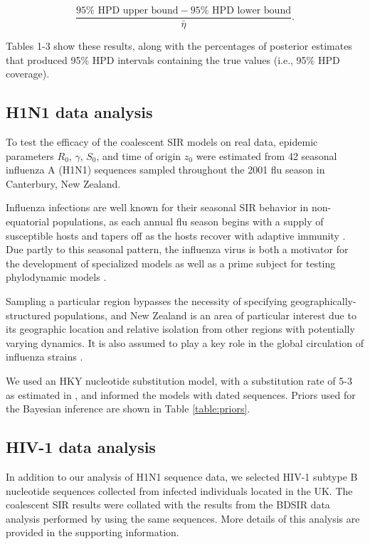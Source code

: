 \documentclass[12pt,titlepage]{article}
\newcommand{\BDSIR}{BDSIR}
\begin{document}
\vspace{3 mm}
\vspace{1 mm}
$$\frac{95\% \text{ HPD upper bound} - 95\% \text{ HPD lower bound}}{\bar{\eta}} . $$

Tables 1-3 show these results, along with the percentages of posterior estimates that produced 95\% HPD intervals containing the true values (i.e., 95\% HPD coverage).


\subsection{H1N1 data analysis}

To test the efficacy of the coalescent SIR models on real data, epidemic parameters $R_0$, $\gamma$, $S_0$, and time of origin $z_{0}$ were estimated from 42 seasonal influenza A (H1N1) sequences sampled throughout the 2001 flu season in Canterbury, New Zealand.

Influenza infections are well known for their seasonal SIR behavior in non-equatorial populations, as each annual flu season begins with a supply of susceptible hosts and tapers off as the hosts recover with adaptive immunity \citep{Iwasaki}.  
Due partly to this seasonal pattern, the influenza virus is both a motivator for the development of specialized models as well as a prime subject for testing phylodynamic models \citep{Koelle:2006}.

Sampling a particular region bypasses the necessity of specifying geographically-structured populations, and New Zealand 
is an area of particular interest due to its geographic location and relative isolation from other regions with potentially varying dynamics.  
It is also assumed to play a key role in the global circulation of influenza strains \citep{RambautAndHolmes, Bedford:2010}. 

We used an HKY nucleotide substitution model, with a substitution rate of 5\mbox{-3} as estimated in \cite{Vaughan:2014}, and informed the models with dated sequences.  Priors used for the Bayesian inference are shown in Table \ref{table:priors}.

\subsection{HIV-1 data analysis}
  
In addition to our analysis of H1N1 sequence data, we selected HIV-1 subtype B nucleotide sequences collected from infected individuals located 
in the UK.  The coalescent SIR results were collated with the results from the \BDSIR{} data analysis performed by \cite{Kuhnert:2014} using the same sequences.  More 
details of this analysis are provided in the supporting information.
\end{document}
